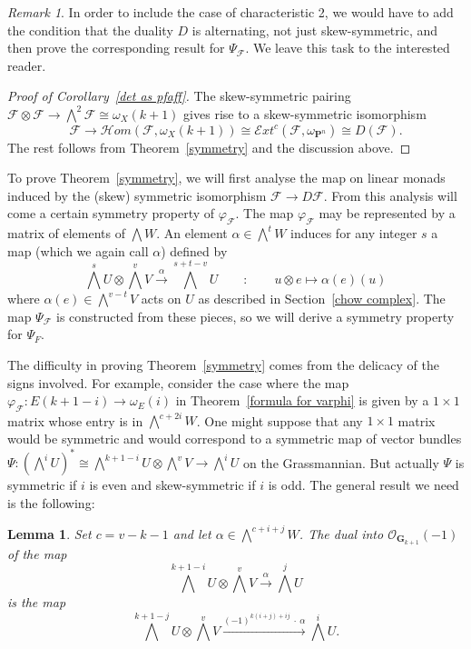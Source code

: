 \documentclass{jams-l}
\newtheorem{lemma}[theorem]{Lemma}
\theoremstyle{definition}
\theoremstyle{remark}
\newtheorem*{remark}{Remark}
\newcommand{\cE} {{\mathcal E}}
\newcommand{\F}{{\mathcal F}}
\newcommand{\GG}{{\mathbf G}}
\newcommand{\cH}{{\mathcal H}}
\newcommand{\Ocal}{{\mathcal O}}
\newcommand{\PP}{{\mathbf P}}
\newcommand{\iso}{\cong}
\newcommand{\rTo}{\xrightarrow}
\begin{document}
\begin{remark} In order to include the case
of characteristic 2, we would have to add the condition
that the duality $D$ is alternating, not just skew-symmetric,
and then prove the corresponding result for $\Psi_\F$.
We leave this task to the interested reader.
\end{remark} 

\begin{proof}[Proof of Corollary~\ref{det as pfaff}]
The skew-symmetric pairing 
$\F\otimes \F\to \bigwedge^2\F\iso \omega_X(k+1)$
gives rise to a skew-symmetric isomorphism 
\[
\F\to \cH om(\F,\omega_X(k+1))\iso 
\cE xt^c(\F,\omega_{\PP^n})\iso D(\F).
\]
The rest follows from Theorem~\ref{symmetry} and the discussion above.
\end{proof}

To prove Theorem~\ref{symmetry}, we will first analyse the map
on linear monads induced by the (skew) symmetric
isomorphism $\F\to D\F$. From this analysis will
come a certain symmetry property of $\varphi_\F$.
The map $\varphi_\F$ may be represented by a matrix
of elements of $\bigwedge W$.
An element $\alpha\in \bigwedge^{t} W$ induces
for any integer $s$ a map
(which we again call $\alpha$) defined by
\[
\bigwedge^{s}U\otimes \bigwedge^vV \rTo{\alpha} \bigwedge^{s+t-v}U\qquad:\qquad
u\otimes e \mapsto \alpha(e)(u)
\]
where $\alpha(e)\in \bigwedge^{v-t}V$ acts on $U$ as described
in Section~\ref{chow complex}. The map $\Psi_\F$ is constructed
from these pieces, so we will derive a symmetry property
for $\Psi_F$.

The difficulty in proving Theorem~\ref{symmetry} comes
from the delicacy of the signs involved. For example,
consider the case where the map 
$\varphi_\F: E(k+1-i)\to \omega_E(i)$ in 
Theorem~\ref{formula for varphi} is given by a 
$1\times 1$ matrix whose entry is in $\bigwedge^{c+2i}W$.
One might suppose that any $1\times 1$ matrix would
be symmetric and would correspond 
to a symmetric map of vector bundles
$\Psi: (\bigwedge^iU)^*\iso\bigwedge^{k+1-i}U\otimes \bigwedge^vV\to \bigwedge^iU$ on the 
Grassmannian. But actually $\Psi$ is symmetric 
if $i$ is even and skew-symmetric if $i$ is odd.
The general result we need is the following:

\begin{lemma}\label{gr signs}
Set $c=v-k-1$ and let $\alpha\in \bigwedge^{c+i+j}W$.
The dual into $\Ocal_{\GG_{k+1}}(-1)$ of the map
\[
\bigwedge^{k+1-i}U\otimes \bigwedge^vV \rTo{\alpha} \bigwedge^jU
\]
is the map
\[
\bigwedge^{k+1-j}U\otimes \bigwedge^vV 
\rTo{(-1)^{k(i+j)+ij}\ \cdot\ \alpha}
\bigwedge^iU.
\]
\end{lemma}
\end{document}
